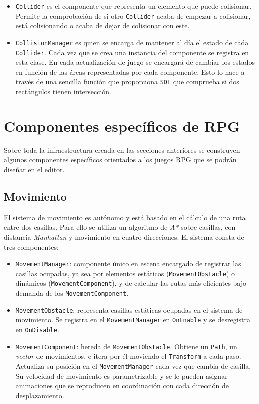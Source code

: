 \begin{itemize}
	\item \texttt{Collider} es el componente que representa un elemento que puede colisionar. Permite la comprobación de si otro \texttt{Collider} acaba de empezar a colisionar, está colisionando o acaba de dejar de colisionar con este. 
	\item \texttt{CollisionManager} es quien se encarga de mantener al día el estado de cada \texttt{Collider}. Cada vez que se crea una instancia del componente se registra en esta clase. En cada actualización de juego se encargará de cambiar los estados en función de las áreas representadas por cada componente. Esto lo hace a través de una sencilla función que proporciona \texttt{SDL} que comprueba si dos rectángulos tienen intersección.
\end{itemize}

\section{Componentes específicos de RPG}
Sobre toda la infraestructura creada en las secciones anteriores se construyen algunos componentes específicos orientados a los juegos RPG que se podrán diseñar en el editor. 

\subsection{Movimiento}
El sistema de movimiento es autónomo y está basado en el cálculo de una ruta entre dos casillas. Para ello se utiliza un algoritmo de \textit{A*} sobre casillas, con distancia \textit{Manhattan} y movimiento en cuatro direcciones. El sistema consta de tres componentes: 

\begin{itemize}
	\item \texttt{MovementManager}: componente único en escena encargado de registrar las casillas ocupadas, ya sea por elementos estáticos (\texttt{MovementObstacle}) o dinámicos (\texttt{MovementComponent}), y de calcular las rutas más eficientes bajo demanda de los \texttt{MovementComponent}. 
	\item \texttt{MovementObstacle}: representa casillas estáticas ocupadas en el sistema de movimiento. Se registra en el \texttt{MovementManager} en \texttt{OnEnable} y se desregistra en \texttt{OnDisable}. 
	\item \texttt{MovementComponent}: hereda de \texttt{MovementObstacle}. Obtiene un \texttt{Path}, un \textit{vector} de movimientos, e itera por él moviendo el \texttt{Transform} a cada paso. Actualiza su posición en el \texttt{MovementManager} cada vez que cambia de casilla. Su velocidad de movimiento es parametrizable y se le pueden asignar animaciones que se reproducen en coordinación con cada dirección de desplazamiento. 
\end{itemize}

